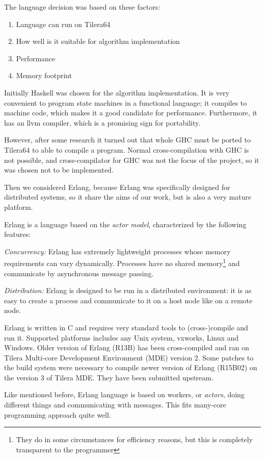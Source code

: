 \documentclass[english,11pt]{article}
\begin{document}
The language decision was based on these factors:
\begin{enumerate}
    \item Language can run on Tilera64
    \item How well is it suitable for algorithm implementation
    \item Performance
    \item Memory footprint
\end{enumerate}

Initially Haskell was chosen for the algorithm implementation. It is very
convenient to program state machines in a functional language; it compiles to
machine code, which makes it a good candidate for performance. Furthermore, it
has an llvm compiler, which is a promising sign for portability.

However, after some research it turned out that whole GHC must be ported to
Tilera64 to able to compile a program. Normal cross-compilation with GHC is not
possible, and cross-compilator for GHC was not the focus of the project, so it
was chosen not to be implemented.

Then we considered Erlang, because Erlang was specifically designed for
distributed systems, so it share the aims of our work, but is also a very
mature platform.

Erlang is a language based on the  {\em actor model}, characterized by the
following features:

{\em Concurrency:} Erlang has extremely lightweight processes whose memory
requirements can vary dynamically. Processes have no shared
memory\footnote{They do in some circumstances for efficiency reasons, but this
is completely transparent to the programmer} and communicate by asynchronous
message passing. 

{\em Distribution:} Erlang is designed to be run in a distributed
environment: it is as easy to create a process and communicate to
it on a host node like on a remote node.

Erlang is written in C and requires very standard tools to (cross-)compile and
run it. Supported platforms includes any Unix system, vxworks, Linux and
Windows. Older version of Erlang (R13B) has been cross-compiled and ran on
Tilera Multi-core Development Environment (MDE) version 2. Some patches to the
build system were necessary to compile newer version of Erlang (R15B02) on the
version 3 of Tilera MDE. They have been submitted upstream.

Like mentioned before, Erlang language is based on workers, or {\em actors},
doing different things and communicating with messages. This fits many-core
programming approach quite well.
\end{document}
